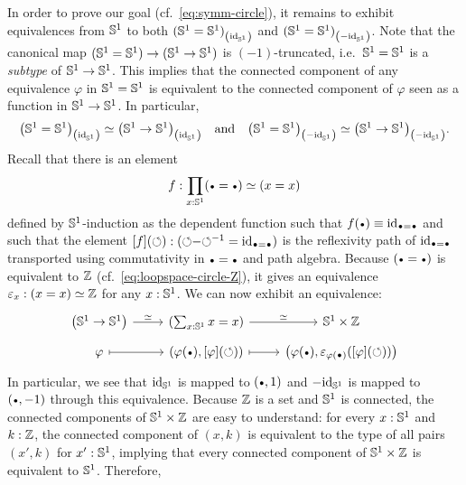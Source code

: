 \documentclass[english,a4paper]{lmcs}
\begin{document}
In order to prove our goal (cf.~\cref{eq:symm-circle}), it remains to
exhibit equivalences from ${{\mathbb S^{1}}}$ to both
${({{\mathbb S^{1}}}={{\mathbb S^{1}}})}_{\left(\mathord{\mathrm{id}}_{{\mathbb S^{1}}}\right)}$ and
${({{\mathbb S^{1}}}={{\mathbb S^{1}}})}_{\left(-\mathord{\mathrm{id}}_{{\mathbb S^{1}}}\right)}$.
Note that the canonical map $({{\mathbb S^{1}}} = {{\mathbb S^{1}}}) \to ({{\mathbb S^{1}}} \to {{\mathbb S^{1}}})$ is $(-1)$-truncated, i.e.\ ${{\mathbb S^{1}}}={{\mathbb S^{1}}}$ is a \emph{subtype} of ${{\mathbb S^{1}}}\to{{\mathbb S^{1}}}$.
This implies that
the connected component of any equivalence
$\varphi$ in ${{\mathbb S^{1}}}={{\mathbb S^{1}}}$ is equivalent to the connected component of
$\varphi$ seen as a function in ${{\mathbb S^{1}}} \to {{\mathbb S^{1}}}$. In particular,
\begin{displaymath}
  {\left({{\mathbb S^{1}}}={{\mathbb S^{1}}}\right)}_{\left(\mathord{\mathrm{id}}_{{\mathbb S^{1}}}\right)} \simeq {\left({{\mathbb S^{1}}}\to{{\mathbb S^{1}}}\right)}_{\left(\mathord{\mathrm{id}}_{{\mathbb S^{1}}}\right)}
  \quad\text{and}\quad
  {\left({{\mathbb S^{1}}}={{\mathbb S^{1}}}\right)}_{\left(-\mathord{\mathrm{id}}_{{\mathbb S^{1}}}\right)} \simeq {\left({{\mathbb S^{1}}}\to{{\mathbb S^{1}}}\right)}_{\left(-\mathord{\mathrm{id}}_{{\mathbb S^{1}}}\right)}.
\end{displaymath}
Recall that there is an element
\begin{equation}
  \label{eq:S1-loopspace-Z-at-each-x}%
  f\from \prod_{x:\Sc} (\base=\base) \weq (x=x)
\end{equation}
defined by
${{\mathbb S^{1}}}$-induction as the dependent function such that
$f(\base) \jdeq \id_{\base=\base}$ and such that the element
$\ap f (\Sloop) \from (\Sloop\blank\inv\Sloop = \id_{\base=\base})$ is
the reflexivity path of $\id_{\base=\base}$ transported using
commutativity in $\base=\base$ and path algebra.
Because $(\base=\base)$ is equivalent
to $\mathbb{Z}$ (cf.~\cref{eq:loopspace-circle-Z}), it gives an equivalence
$\varepsilon_x: (x=x) \simeq \mathbb{Z}$ for any $x:{{\mathbb S^{1}}}$. We can now
exhibit an equivalence:
\begin{displaymath}
  \begin{tikzcd}[row sep=tiny]
    \left(\Sc \to \Sc\right) \rar["\weq"] & (\sum_{x\from\Sc}x=x)
    \rar["\weq"] & \Sc \times \ZZ
    \\
    \varphi \rar[mapsto] & (\varphi(\base),\ap \varphi (\Sloop))
    \rar[mapsto] & \left(%
      \varphi(\base), \varepsilon_{\varphi(\base)}(\ap\varphi(\Sloop))%
    \right)%
\end{tikzcd}
\end{displaymath}
In particular, we see that $\mathord{\mathrm{id}}_{{\mathbb S^{1}}}$ is mapped to $(\base,1)$
and $-\mathord{\mathrm{id}}_{{\mathbb S^{1}}}$ is mapped to $(\base,-1)$ through this
equivalence. Because $\mathbb{Z}$ is a set and ${{\mathbb S^{1}}}$ is connected, the
connected components of ${{\mathbb S^{1}}}\times\mathbb{Z}$ are easy to understand: for
every $x:{{\mathbb S^{1}}}$ and $k:\mathbb{Z}$, the connected component of $(x,k)$ is
equivalent to the type of all pairs $(x',k)$ for
$x':{{\mathbb S^{1}}}$, implying that every connected component of
${{\mathbb S^{1}}}\times\mathbb{Z}$ is equivalent to ${{\mathbb S^{1}}}$. Therefore, %
\end{document}
